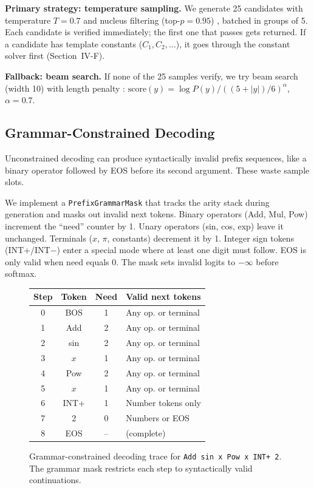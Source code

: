 \documentclass[conference]{IEEEtran}
\begin{document}
\textbf{Primary strategy: temperature sampling.} We generate 25 candidates with temperature $T = 0.7$ and nucleus filtering (top-$p = 0.95$) \cite{b16}, batched in groups of 5. Each candidate is verified immediately; the first one that passes gets returned. If a candidate has template constants ($C_1, C_2, \ldots$), it goes through the constant solver first (Section~IV-F).

\textbf{Fallback: beam search.} If none of the 25 samples verify, we try beam search (width 10) with length penalty \cite{b35}: $\text{score}(y) = \log P(y) / ((5 + |y|) / 6)^\alpha$, $\alpha = 0.7$.

\subsection{Grammar-Constrained Decoding}

Unconstrained decoding can produce syntactically invalid prefix sequences, like a binary operator followed by EOS before its second argument. These waste sample slots.

We implement a \texttt{PrefixGrammarMask} that tracks the arity stack during generation and masks out invalid next tokens. Binary operators (Add, Mul, Pow) increment the ``need'' counter by 1. Unary operators (sin, cos, exp) leave it unchanged. Terminals ($x$, $\pi$, constants) decrement it by 1. Integer sign tokens (INT+/INT$-$) enter a special mode where at least one digit must follow. EOS is only valid when need equals 0. The mask sets invalid logits to $-\infty$ before softmax.

\begin{figure}[htbp]
\begin{center}
\begin{tabular}{|c|c|c|l|}
\hline
\textbf{Step} & \textbf{Token} & \textbf{Need} & \textbf{Valid next tokens} \\
\hline
0 & BOS & 1 & Any op. or terminal \\
\hline
1 & Add & 2 & Any op. or terminal \\
\hline
2 & sin & 2 & Any op. or terminal \\
\hline
3 & $x$ & 1 & Any op. or terminal \\
\hline
4 & Pow & 2 & Any op. or terminal \\
\hline
5 & $x$ & 1 & Any op. or terminal \\
\hline
6 & INT+ & 1 & Number tokens only \\
\hline
7 & 2 & 0 & Numbers or EOS \\
\hline
8 & EOS & -- & (complete) \\
\hline
\end{tabular}
\end{center}
\caption{Grammar-constrained decoding trace for \texttt{Add sin x Pow x INT+ 2}. The grammar mask restricts each step to syntactically valid continuations.}
\label{fig:grammar}
\end{figure}
\end{document}

